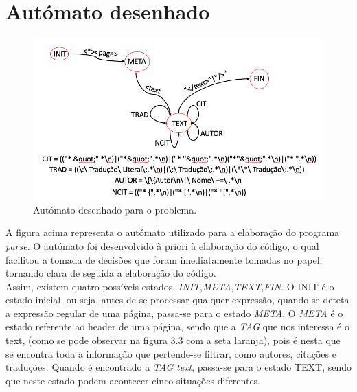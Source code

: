 \documentclass[11pt,a4paper]{report}%
\begin{document}
\newpage

\section{Autómato desenhado}

\begin{figure}[H]
	\centering
	\includegraphics[scale=0.6]{automato.png}
	\caption{Autómato desenhado para o problema.}
	\label{img:automato}
\end{figure}

A figura acima representa o autómato utilizado para a elaboração do programa \emph{parse}. O autómato foi desenvolvido à priori à elaboração do código, o qual facilitou a tomada de decisões que foram imediatamente tomadas no papel, tornando clara de seguida a elaboração do código.\\
Assim, existem quatro possíveis estados, \emph{INIT},\emph{META},\emph{TEXT},\emph{FIN}. O INIT é o estado inicial, ou seja, antes de se processar qualquer expressão, quando se deteta a expressão regular de uma página, passa-se para o estado \emph{META}. O \emph{META} é o estado referente ao header de uma página, sendo que a \emph{TAG} que nos interessa é o text, (como se pode observar na figura 3.3 com a seta laranja), pois é nesta que se encontra toda a informação que pertende-se filtrar, como autores, citações e traduções. Quando é encontrado a \emph{TAG} \emph{text}, passa-se para o estado TEXT, sendo que neste estado podem acontecer cinco situações diferentes.\\\\ 
\end{document}
